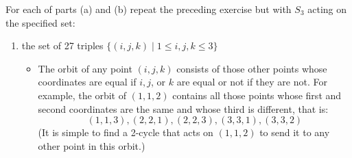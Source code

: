 \documentclass{article}
\begin{document}
For each of parts (a) and (b) repeat the preceding exercise but with $S_3$ acting on the specified set:
\begin{enumerate}[itemsep=0em,label=(\alph*)]
    \item the set of 27 triples $\{ (i, j, k) \mid 1 \leq i, j, k \leq 3 \}$
        \begin{itemize}[itemsep=0em]
            \item The orbit of any point $(i, j, k)$ consists of those other points whose coordinates are equal if $i, j$, or $k$ are equal or not if they are not. For example, the orbit of $(1, 1, 2)$ contains all those points whose first and second coordinates are the same and whose third is different, that is:
            \begin{equation*}
                (1, 1, 3), (2, 2, 1), (2, 2, 3), (3, 3, 1), (3, 3, 2)
            \end{equation*}
            (It is simple to find a 2-cycle that acts on $(1, 1, 2)$ to send it to any other point in this orbit.)


\end{itemize}
\end{enumerate}
\end{document}
